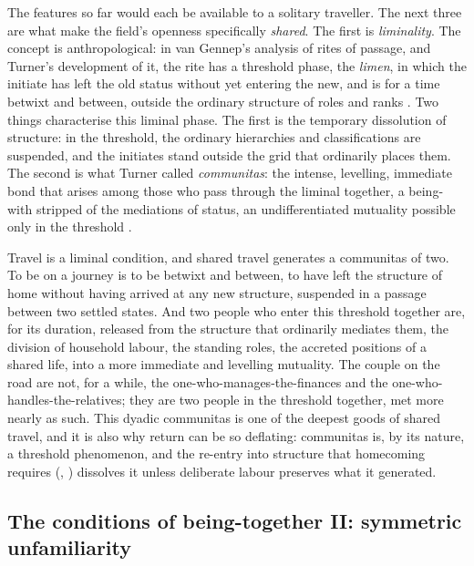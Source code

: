 The features so far would each be available to a solitary traveller. The next three are what make the field's openness specifically \emph{shared}. The first is \emph{liminality}. The concept is anthropological: in van Gennep's analysis of rites of passage, and Turner's development of it, the rite has a threshold phase, the \emph{limen}, in which the initiate has left the old status without yet entering the new, and is for a time betwixt and between, outside the ordinary structure of roles and ranks \parencite{vangennep1960,turner1969}. Two things characterise this liminal phase. The first is the temporary dissolution of structure: in the threshold, the ordinary hierarchies and classifications are suspended, and the initiates stand outside the grid that ordinarily places them. The second is what Turner called \emph{communitas}: the intense, levelling, immediate bond that arises among those who pass through the liminal together, a being-with stripped of the mediations of status, an undifferentiated mutuality possible only in the threshold \parencite{turner1969}.

Travel is a liminal condition, and shared travel generates a communitas of two. To be on a journey is to be betwixt and between, to have left the structure of home without having arrived at any new structure, suspended in a passage between two settled states. And two people who enter this threshold together are, for its duration, released from the structure that ordinarily mediates them, the division of household labour, the standing roles, the accreted positions of a shared life, into a more immediate and levelling mutuality. The couple on the road are not, for a while, the one-who-manages-the-finances and the one-who-handles-the-relatives; they are two people in the threshold together, met more nearly as such. This dyadic communitas is one of the deepest goods of shared travel, and it is also why return can be so deflating: communitas is, by its nature, a threshold phenomenon, and the re-entry into structure that homecoming requires (, ) dissolves it unless deliberate labour preserves what it generated.

\subsection{The conditions of being-together II: symmetric unfamiliarity}
\label{p21:sub:field-unfamiliarity}

